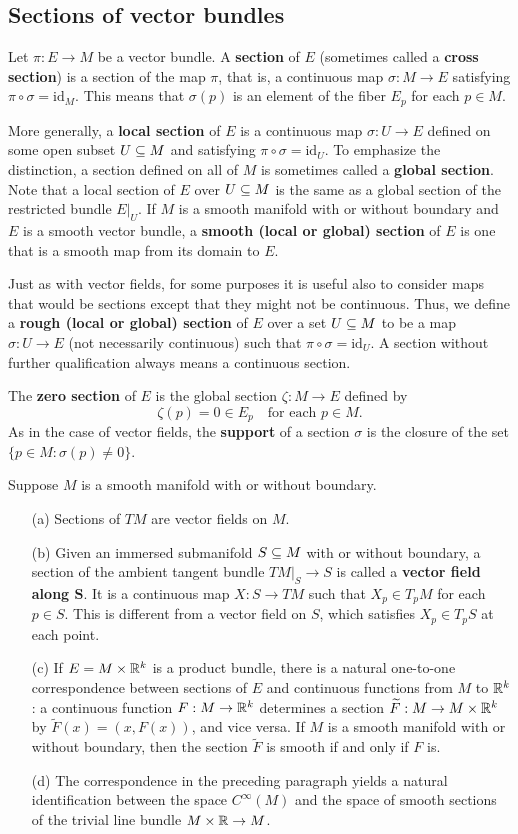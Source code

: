 \subsection{Sections of vector bundles}
Let $\pi:E\to M$ be a vector bundle. A \textbf{section} of $E$ (sometimes called a \textbf{cross section}) is a section of the map $\pi$, that is, a continuous map $\sigma:M\to E$ satisfying $\pi\circ\sigma=\mathrm{id}_M$. This means that $\sigma(p)$ is an element of the fiber $E_p$ for each $p\in M$.\par
More generally, a \textbf{local section} of $E$ is a continuous map $\sigma:U\to E$ defined on some open subset $U\subseteq M$ and satisfying $\pi\circ\sigma=\mathrm{id}_U$. To emphasize the distinction, a section defined on all of $M$ is sometimes called a \textbf{global section}. Note that a local section of $E$ over $U\subseteq M$ is the same as a global section of the restricted bundle $E|_U$. If $M$ is a smooth manifold with or without boundary and $E$ is a smooth vector bundle, a \textbf{smooth (local or global) section} of $E$ is one that is a smooth map from its domain to $E$.\par
Just as with vector fields, for some purposes it is useful also to consider maps that would be sections except that they might not be continuous. Thus, we define a \textbf{rough (local or global) section} of $E$ over a set $U\subseteq M$ to be a map $\sigma:U\to E$ (not necessarily continuous) such that $\pi\circ\sigma=\mathrm{id}_U$. A section without further qualification always means a continuous section.\par
The \textbf{zero section} of $E$ is the global section $\zeta:M\to E$ defined by
\[\zeta(p)=0\in E_p\quad\text{for each }p\in M.\]
As in the case of vector fields, the \textbf{support} of a section $\sigma$ is the closure of the set $\{p\in M:\sigma(p)\neq 0\}$.
\begin{example}
Suppose $M$ is a smooth manifold with or without boundary.
\begin{itemize}
\item[(a)]Sections of $TM$ are vector fields on $M$.
\item[(b)]Given an immersed submanifold $S\subseteq M$ with or without boundary, a section of the ambient tangent bundle $TM|_S\to S$ is called a \textbf{vector field along $\bm{S}$}. It is a continuous map $X:S\to TM$ such that $X_p\in T_pM$ for each $p\in S$. This is different from a vector field on $S$, which satisfies $X_p\in T_pS$ at each point.
\item[(c)]If $E=M\times\mathbb{R}^k$ is a product bundle, there is a natural one-to-one correspondence between sections of $E$ and continuous functions from $M$ to $\mathbb{R}^k$: a continuous function $F:M\to\mathbb{R}^k$ determines a section $\widetilde{F}:M\to M\times\mathbb{R}^k$ by $\widetilde{F}(x)=(x,F(x))$, and vice versa. If $M$ is a smooth manifold with or without boundary, then the section $\widetilde{F}$ is smooth if and only if $F$ is.
\item[(d)]The correspondence in the preceding paragraph yields a natural identification between the space $C^\infty(M)$ and the space of smooth sections of the trivial line bundle $M\times\mathbb{R}\to M$.
\end{itemize}
\end{example}

